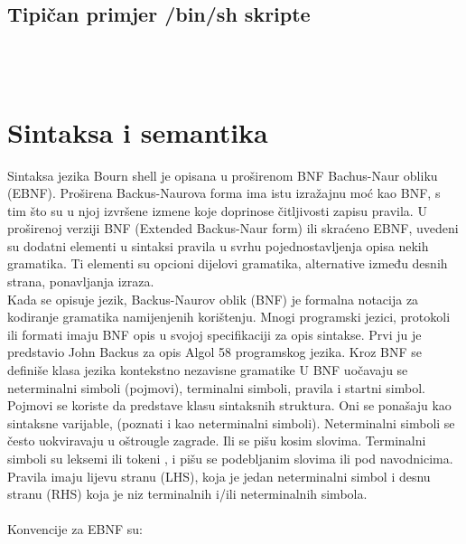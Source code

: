 \documentclass[11pt]{book}
\begin{document}
\subsection {Tipičan primjer /bin/sh skripte}
\\\\


\section{Sintaksa i semantika}

Sintaksa jezika Bourn shell je opisana u proširenom BNF Bachus-Naur obliku (EBNF). 
Proširena Backus-Naurova forma ima istu izražajnu moć kao BNF, s tim što su u njoj izvršene izmene koje doprinose čitljivosti zapisu pravila. U proširenoj verziji BNF (Extended Backus-Naur form)  ili skraćeno EBNF, uvedeni su dodatni elementi u sintaksi pravila u svrhu pojednostavljenja opisa nekih gramatika. Ti elementi su opcioni dijelovi gramatika, alternative između desnih strana, ponavljanja izraza.\\ 
Kada se opisuje jezik, Backus-Naurov oblik (BNF) je formalna notacija za kodiranje gramatika namijenjenih korištenju. Mnogi programski jezici, protokoli ili formati imaju BNF opis u svojoj specifikaciji za opis sintakse. Prvi ju je predstavio John Backus za opis Algol 58 programskog jezika. Kroz BNF se definiše klasa jezika kontekstno nezavisne gramatike U BNF uočavaju se neterminalni simboli (pojmovi), terminalni simboli, pravila i startni simbol. Pojmovi se koriste da predstave klasu sintaksnih struktura. Oni se ponašaju kao sintaksne varijable, (poznati i kao neterminalni simboli). Neterminalni simboli se često uokviravaju u oštrougle zagrade. Ili se pišu kosim slovima. Terminalni simboli su leksemi ili tokeni , i pišu se podebljanim slovima ili pod navodnicima. Pravila imaju lijevu stranu (LHS), koja je jedan neterminalni simbol i desnu stranu (RHS) koja je niz terminalnih i/ili neterminalnih simbola.\\\\
Konvencije za EBNF su:
\end{document}
